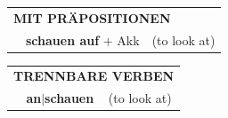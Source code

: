\documentclass[10pt,a4paper]{revtex4-2}
\begin{document}
\begin{verbbox}
\vspace{10pt}

\begin{tabular}{lll}
\multicolumn{3}{l}{\textbf{MIT PRÄPOSITIONEN}}\\
& \textbf{schauen auf} + Akk & (to look at)\\
\end{tabular}
\hfill
\begin{tabular}{lll}
\multicolumn{3}{l}{\textbf{TRENNBARE VERBEN}}\\
& \textbf{an$|$schauen} & (to look at)\\
\end{tabular}

\vspace{-5pt}
\end{verbbox}
\end{document}
